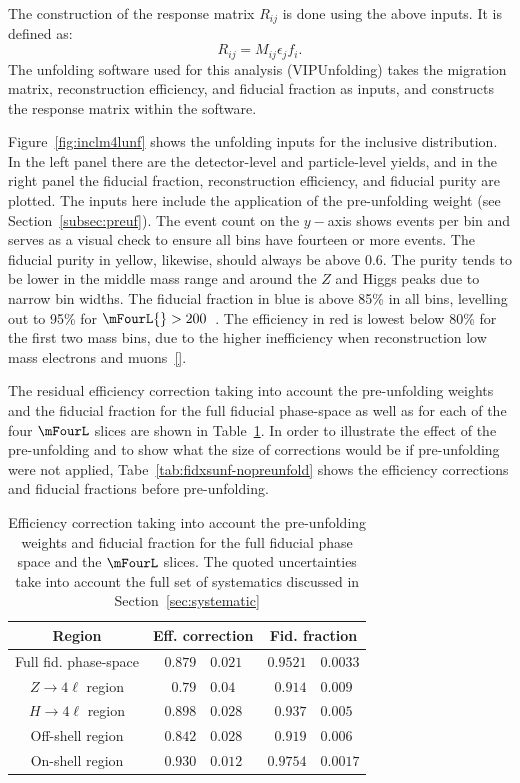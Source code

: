 The construction of the response matrix $R_{ij}$ is done using the above inputs. It is defined as:
\begin{equation}
    R_{ij} = M_{ij}\epsilon_jf_i.
\end{equation}
The unfolding software used for this analysis (VIPUnfolding) takes the migration matrix, reconstruction efficiency, and fiducial fraction as inputs, and constructs the response matrix within the software. 

Figure~\ref{fig:inclm4lunf} shows the unfolding inputs for the inclusive \mFourL{} distribution. In the left panel there are the detector-level and particle-level yields, and in the right panel the fiducial fraction, reconstruction efficiency, and fiducial purity are plotted. The inputs here include the application of the pre-unfolding weight (see Section~\ref{subsec:preuf}). The event count on the $y-$axis shows events per bin and serves as a visual check to ensure all bins have fourteen or more events. The fiducial purity in yellow, likewise, should always be above 0.6. The purity tends to be lower in the middle mass range and around the $Z$ and Higgs peaks due to narrow bin widths. The fiducial fraction in blue is above 85\% in all bins, levelling out to 95\% for $\mFourL{} > 200$~\GeV. The efficiency in red is lowest below 80\% for the first two mass bins, due to the higher inefficiency when reconstruction low mass electrons and muons~\ref{}. 

 The residual efficiency correction taking into account the pre-unfolding weights and the fiducial fraction for the full fiducial phase-space as well as for each of the four $\mFourL$ slices are shown in Table~\ref{tab:fidxsunf}.
 In order to illustrate the effect of the pre-unfolding and to show what the size of corrections would be if pre-unfolding were not applied, Tabe~\ref{tab:fidxsunf-nopreunfold} shows the efficiency corrections and fiducial fractions before pre-unfolding.
 \begin{table}[ht]
     \centering
     \begin{tabular} { c | r@{$\pm$} l  r@{$\pm$}l }
       \hline
       Region & \multicolumn{2}{c}{Eff. correction}  & \multicolumn{2}{c}{Fid. fraction}   \\
       \hline
       Full fid. phase-space & $0.879$ & $0.021$ & $0.9521$ & $0.0033$ \\[0.3cm]
       $Z\to 4\ell$ region  & $0.79$ & $0.04$ & $0.914$ & $0.009$ \\
       $H\to 4\ell$ region  & $0.898$ & $0.028$ & $0.937$ & $0.005$ \\
       Off-shell region & $0.842$ & $0.028$ & $0.919$ & $0.006$ \\
       On-shell region  & $0.930$ & $0.012$ & $0.9754$ & $0.0017$ \\
       \hline
    \end{tabular}
   \caption{Efficiency correction taking into account the pre-unfolding weights and fiducial fraction for the full fiducial phase space and the $\mFourL$ slices. The quoted uncertainties take into account the full set of systematics discussed in Section~\ref{sec:systematic} \label{tab:fidxsunf} }
 \end{table}

